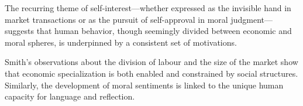 \begin{remark}
The recurring theme of self-interest---whether expressed as the invisible hand in market transactions or as the pursuit of self-approval in moral judgment---suggests that human behavior, though seemingly divided between economic and moral spheres, is underpinned by a consistent set of motivations.
\end{remark}

\begin{remark}
Smith’s observations about the division of labour and the size of the market show that economic specialization is both enabled and constrained by social structures. Similarly, the development of moral sentiments is linked to the unique human capacity for language and reflection.
\end{remark}
